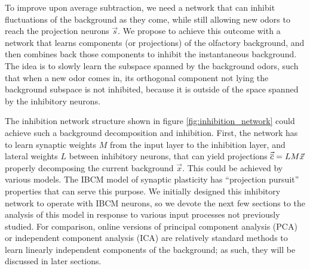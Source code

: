 

To improve upon average subtraction, we need a network that can inhibit fluctuations of the background as they come, while still allowing new odors to reach the projection neurons $\vec{s}$. We propose to achieve this outcome with a network that learns components (or projections) of the olfactory background, and then combines back those components to inhibit the instantaneous background. The idea is to slowly learn the subspace spanned by the background odors, such that when a new odor comes in, its orthogonal component not lying the background subspace is not inhibited, because it is outside of the space spanned by the inhibitory neurons. 

The inhibition network structure shown in figure \ref{fig:inhibition_network} could achieve such a background decomposition and inhibition. First, the network has to learn synaptic weights $M$ from the input layer to the inhibition layer, and lateral weights $L$ between inhibitory neurons, that can yield projections $\vec{\overline{c}} = LM \vec{x}$ properly decomposing the current background $\vec{x}$. This could be achieved by various models. The IBCM model of synaptic plasticity \cite{intrator_objective_1992} has ``projection pursuit'' properties that can serve this purpose. We initially designed this inhibitory network to operate with IBCM neurons, so we devote the next few sections to the analysis of this model in response to various input processes not previously studied. For comparison, online versions of principal component analysis (PCA) \cite{minden_biologically_2018} or independent component analysis (ICA) \cite{hyvarinen_independent_2000, lipshutz_biologically_2022} are relatively standard methods to learn linearly independent components of the background; as such, they will be discussed in later sections.  


